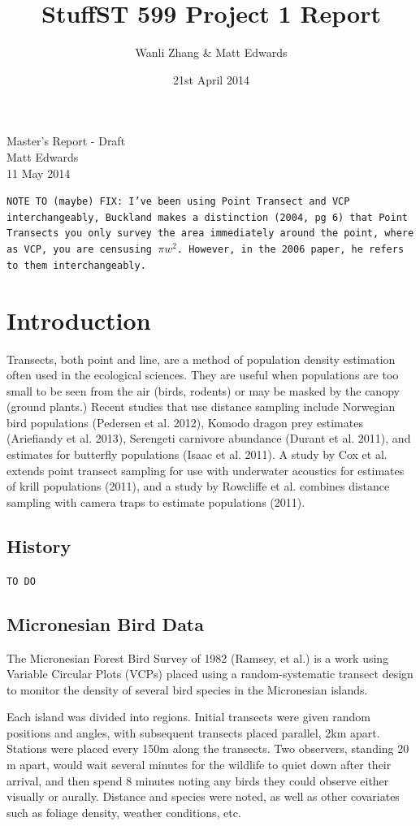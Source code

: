 \documentclass[12pt]{article}
\title{\vspace{-2.0cm}Stuff}
\title{ST 599 Project 1 Report}
\author{Wanli Zhang \& Matt Edwards}
\date{21st April 2014}
\begin{document}
\begingroup  
  \centering
  \LARGE Master's Report - Draft\\[1em]
  \large Matt Edwards\\
  11 May 2014\par
\endgroup
\texttt{NOTE TO (maybe) FIX: I've been using Point Transect and VCP interchangeably, Buckland makes a distinction (2004, pg 6) that Point Transects you only survey the area immediately around the point, where as VCP, you are censusing $\pi w^2$. However, in the 2006 paper, he refers to them interchangeably.}
\section{Introduction}
Transects, both point and line, are a method of population density estimation often used in the ecological sciences. They are useful when populations are too small to be seen from the air (birds, rodents) or may be masked by the canopy (ground plants.) Recent studies that use distance sampling include Norwegian bird populations (Pedersen et al. 2012), Komodo dragon prey estimates (Ariefiandy et al. 2013), Serengeti carnivore abundance (Durant et al. 2011), and estimates for butterfly populations (Isaac et al. 2011). A study by Cox et al. extends point transect sampling for use with underwater acoustics for estimates of krill populations (2011), and a study by Rowcliffe et al. combines distance sampling with camera traps to estimate populations (2011). 

\subsection{History}
\texttt{TO DO}

\subsection{Micronesian Bird Data}
The Micronesian Forest Bird Survey of 1982 (Ramsey, et al.) is a work using Variable Circular Plots (VCPs) placed using a random-systematic transect design to monitor the density of several bird species in the Micronesian islands.

Each island was divided into regions. Initial transects were given random positions and angles, with subsequent transects placed parallel, 2km apart. Stations were placed every 150m along the transects. Two observers, standing 20 m apart, would wait several minutes for the wildlife to quiet down after their arrival, and then spend 8 minutes noting any birds they could observe either visually or aurally. Distance and species were noted, as well as other covariates such as foliage density, weather conditions, etc. 
\end{document}
